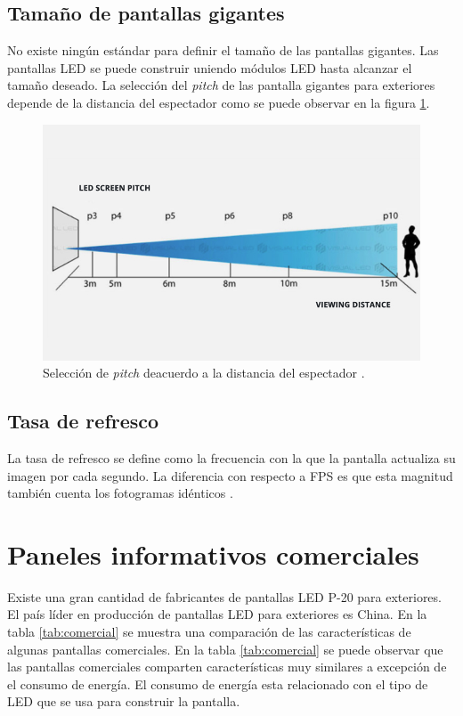 \subsection{Tamaño de pantallas gigantes}
No existe ningún estándar para definir el tamaño de las pantallas gigantes. Las pantallas LED  se puede construir uniendo módulos LED hasta alcanzar el tamaño deseado. La selección del \textit{pitch} de las pantalla gigantes para exteriores depende de la distancia del espectador como se puede observar en la figura \ref{fig:pitchview}.

\begin{figure}[htpb]
	\centering
	\includegraphics[scale=0.6]{Figures/visionpitch.jpg} 
	\caption{Selección de \textit{pitch} deacuerdo a la distancia del espectador \protect\footnotemark.}
	\label{fig:pitchview}
\end{figure}


\subsection{Tasa de refresco}
La tasa de refresco se define como la frecuencia con la que la pantalla actualiza su imagen por cada segundo. La diferencia con respecto a FPS es que esta magnitud también cuenta los fotogramas idénticos \citep{WIKITASA}.




\section{Paneles informativos comerciales}
Existe una gran cantidad de fabricantes de pantallas LED P-20 para exteriores. El país líder en producción de pantallas LED para exteriores es China. En la tabla \ref{tab:comercial} se muestra una comparación de las características de algunas pantallas comerciales. En la tabla \ref{tab:comercial} se puede observar que las pantallas comerciales comparten características muy similares a excepción de el consumo de energía. El consumo de energía esta relacionado con el tipo de LED que se usa para construir la pantalla. 

